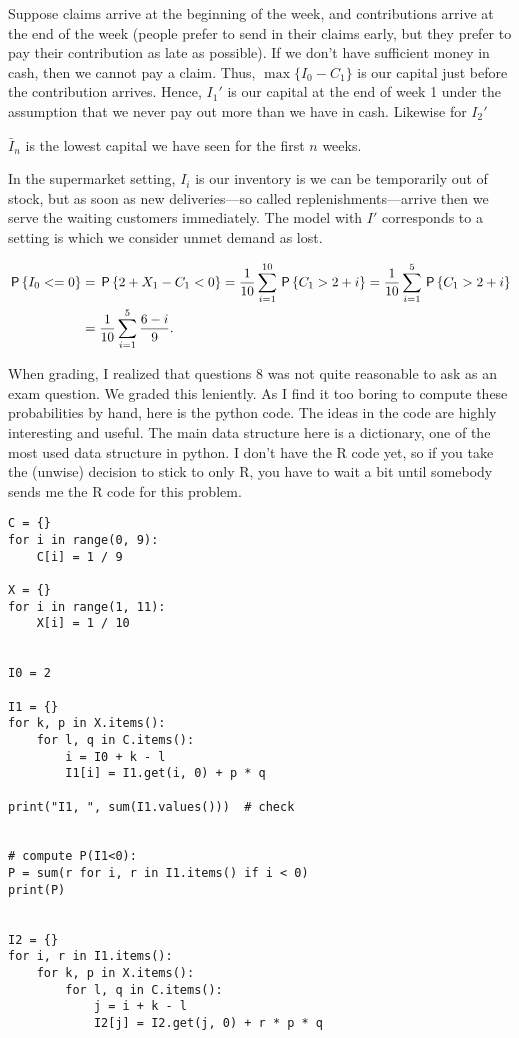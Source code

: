 \begin{exercise}
\begin{solution}
Suppose claims arrive at the beginning of the week, and contributions arrive at the end of the week (people prefer to send in their claims early, but they prefer to pay their contribution as late as possible).
If we don't have sufficient money in cash, then we cannot pay a claim.
Thus, $\max\{I_{0}-C_{1}\}$ is our capital just before the contribution arrives. Hence, $I_{1}'$ is our capital at the end of week 1 under the assumption that we never pay out more than we have in cash. Likewise for $I_{2}'$

$\bar I_{n}$ is the lowest capital we have seen for the first $n$ weeks.

In the supermarket setting, $I_{i}$ is our inventory is we can be temporarily out of stock, but as soon as new deliveries---so called replenishments---arrive then we serve the waiting customers immediately.
The model with $I'$ corresponds to a setting is which we consider unmet demand as lost.

\begin{align}
\P{I_{0} < = 0} &= \P{2 + X_{1} - C_{1} < 0} = \frac{1}{10} \sum_{i=1}^{10} \P{C_{1} > 2 + i } = \frac{1}{10} \sum_{i=1}^{5} \P{C_{1} > 2 + i } \\
&= \frac{1}{10} \sum_{i=1}^{5} \frac{6-i}{9}.
\end{align}

When grading, I realized that questions 8 was not quite reasonable to ask as an exam question.
We graded this leniently.
As I find it too boring to compute these probabilities by hand, here is the python code.
The ideas in the code are highly interesting and useful.
The main data structure here is a dictionary, one of the most used data structure in python.
I don't have the R code yet, so if you take the (unwise) decision to stick to only R, you have to wait a bit until somebody sends me the R code for this problem.
\begin{verbatim}
C = {}
for i in range(0, 9):
    C[i] = 1 / 9

X = {}
for i in range(1, 11):
    X[i] = 1 / 10


I0 = 2

I1 = {}
for k, p in X.items():
    for l, q in C.items():
        i = I0 + k - l
        I1[i] = I1.get(i, 0) + p * q

print("I1, ", sum(I1.values()))  # check


# compute P(I1<0):
P = sum(r for i, r in I1.items() if i < 0)
print(P)


I2 = {}
for i, r in I1.items():
    for k, p in X.items():
        for l, q in C.items():
            j = i + k - l
            I2[j] = I2.get(j, 0) + r * p * q


\end{verbatim}
\end{solution}
\end{exercise}
